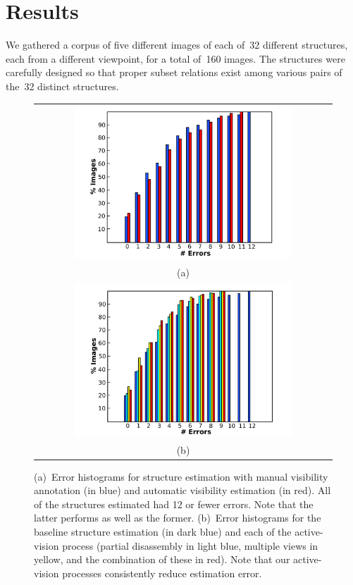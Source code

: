 \section{Results}
\label{sec-ll2:results}

We gathered a corpus of five different images of each of~32 different structures,
each from a different viewpoint, for a total of~160 images.
%
The structures were carefully designed so that proper subset relations exist
among various pairs of the~32 distinct structures.

\begin{figure}
  \centering
  \begin{tabular}{@{}c@{}}
    \includegraphics[width=0.75\textwidth]{images/visibility}\\
    (a)\\
    \includegraphics[width=0.75\textwidth]{images/active-vision}\\
    (b)
  \end{tabular}
  \par\vspace*{-2ex}
  \caption{(a)~Error histograms for structure estimation with manual visibility
    annotation (in blue) and automatic visibility estimation (in red).
    All of the structures estimated had 12 or fewer errors.
    Note that the latter performs as well as the former.
    (b)~Error histograms for the baseline structure estimation (in dark blue)
    and each of the active-vision process (partial disassembly in light blue,
    multiple views in yellow, and the combination of these in red).
    Note that our active-vision processes consistently reduce estimation
    error.}
  \label{fig-ll2:visibility}
  \par\vspace*{-6ex}
\end{figure}

